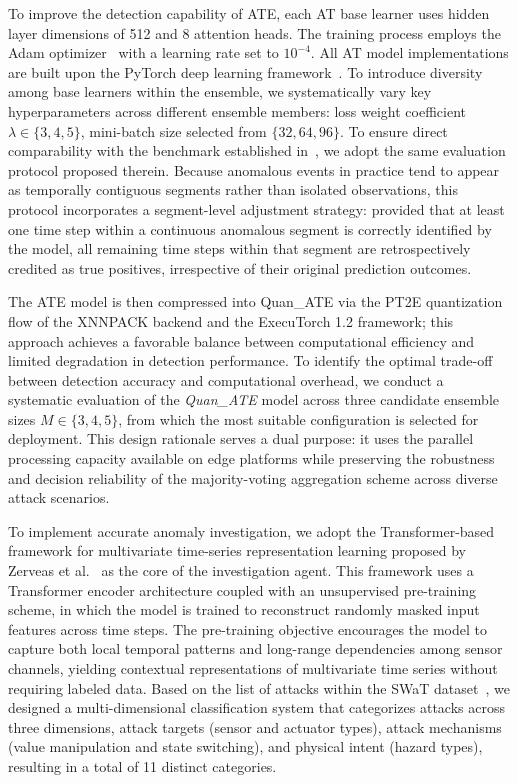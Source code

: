 \documentclass[pdflatex,sn-mathphys-num]{sn-jnl}
\theoremstyle{thmstyleone}
\theoremstyle{thmstyletwo}
\theoremstyle{thmstylethree}
\begin{document}
To improve the detection capability of ATE, each AT base learner uses hidden layer dimensions of 512 and 8 attention heads. The training process employs the Adam optimizer~\cite{kingma:adam} with a learning rate set to $10^{-4}$. All AT model implementations are built upon the PyTorch deep learning framework~\cite{paszke2019pytorch}. 
To introduce diversity among base learners within the ensemble, we systematically vary key hyperparameters across different ensemble members: loss weight coefficient $\lambda \in \{3, 4, 5\}$, mini-batch size selected from $\{32, 64, 96\}$.
To ensure direct comparability with the benchmark established in~\cite{xu2022anomaly,audibert2020usad}, we adopt the same evaluation protocol proposed therein. Because anomalous events in practice tend to appear as temporally contiguous segments rather than isolated observations, this protocol incorporates a segment-level adjustment strategy: provided that at least one time step within a continuous anomalous segment is correctly identified by the model, all remaining time steps within that segment are retrospectively credited as true positives, irrespective of their original prediction outcomes.

The ATE model is then compressed into Quan\_ATE via the PT2E quantization flow of the XNNPACK backend and the ExecuTorch 1.2 framework; this approach achieves a favorable balance between computational efficiency and limited degradation in detection performance. To identify the optimal trade-off between detection accuracy and computational overhead, we conduct a systematic evaluation of the \textit{Quan\_ATE} model across three candidate ensemble sizes $M \in \{3, 4, 5\}$, from which the most suitable configuration is selected for deployment. This design rationale serves a dual purpose: it uses the parallel processing capacity available on edge platforms while preserving the robustness and decision reliability of the majority-voting aggregation scheme across diverse attack scenarios.


To implement accurate anomaly investigation, we adopt the Transformer-based framework for multivariate time-series representation learning proposed by Zerveas et al.~\cite{zerveas2021transformer} as the core of the investigation agent. This framework uses a Transformer encoder architecture coupled with an unsupervised pre-training scheme, in which the model is trained to reconstruct randomly masked input features across time steps. The pre-training objective encourages the model to capture both local temporal patterns and long-range dependencies among sensor channels, yielding contextual representations of multivariate time series without requiring labeled data.
Based on the list of attacks within the SWaT dataset~\cite{mathur2016swat}, we designed a multi-dimensional classification system that categorizes attacks across three dimensions, attack targets (sensor and actuator types), attack mechanisms (value manipulation and state switching), and physical intent (hazard types), resulting in a total of 11 distinct categories.
\end{document}
